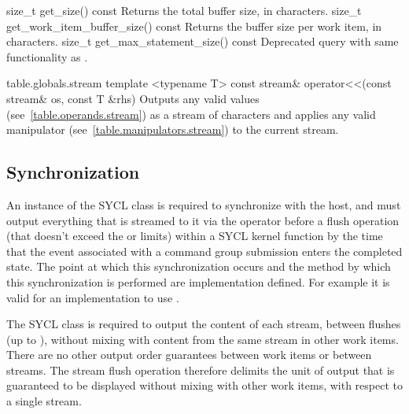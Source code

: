   \addRow
    {size_t get_size() const}
    {
      Returns the total buffer size, in characters.
    }
  \addRow
    {size_t get_work_item_buffer_size() const}
    {
      Returns the buffer size per work item, in characters.
    }
  \addRow
    {size_t get_max_statement_size() const}
    {
      Deprecated query with same functionality as .
    }
\completeTable

{table.globals.stream}
  \addRow
    {template <typename T> const stream\& operator<<(const stream\& os, const T \&rhs)}
    {
      Outputs any valid values (see~\ref{table.operands.stream}) as a stream of characters and applies any valid manipulator (see~\ref{table.manipulators.stream}) to the current stream.
    }
\completeTable

\subsection{Synchronization}

An instance of the SYCL  class is required to synchronize with the host, and must output everything that is streamed to it via the  operator before a flush operation (that doesn't exceed the  or  limits) within a SYCL kernel function by the time that the event associated with a command group submission enters the completed state. The point at which this synchronization occurs and the method by which this synchronization is performed are implementation defined. For example it is valid for an implementation to use .

The SYCL  class is required to output the content of each stream, between flushes (up to ), without mixing with content from the same stream in other work items.  There are no other output order guarantees between work items or between streams.  The stream flush operation therefore delimits the unit of output that is guaranteed to be displayed without mixing with other work items, with respect to a single stream.

